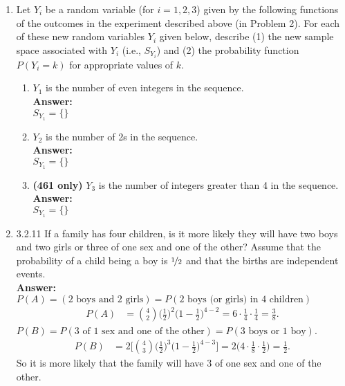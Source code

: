 \documentclass{article}
\begin{document}
\begin{enumerate}
        \item Let $Y_i$ be a random variable (for $i = 1,2,3$) given by the following functions of the outcomes in the experiment described above (in Problem 2). For each of these new random variables $Y_i$ given below, describe (1) the new sample space associated with $Y_i$ (i.e., $S_{Y_i}$) and (2) the probability function $P(Y_i = k)$ for appropriate values of $k$.
            \begin{enumerate}
                \item $Y_1$ is the number of even integers in the sequence.\\
                \textbf{Answer: }\\
                $S_{Y_1} = \{\}$
                
                \item $Y_2$ is the number of 2s in the sequence.\\
                \textbf{Answer: }\\
                $S_{Y_1} = \{\}$
                
                \item \textbf{(461 only)} $Y_3$ is the number of integers greater than 4 in the sequence.\\
                \textbf{Answer: }\\
                $S_{Y_1} = \{\}$
            \end{enumerate}
            
        \item 3.2.11 If a family has four children, is it more likely they will have two boys and two girls or three of one sex and one of the other? Assume that the probability of a child being a boy is $\nicefrac{1}{2}$ and that the births are independent events.\\
        \textbf{Answer: }$P(A) = (\text{2 boys and 2 girls}) = P(\text{2 boys (or girls) in 4 children})$
            \begin{align*}
                P(A) &= {4 \choose 2} \bigg(\frac{1}{2}\bigg)^2\bigg(1-\frac{1}{2}\bigg)^{4-2} = 6 \cdot \frac{1}{4} \cdot \frac{1}{4} = \frac{3}{8}.
            \end{align*}
        $P(B) = P(\text{3 of 1 sex and one of the other}) = P(\text{3 boys or 1 boy})$.
            \begin{align*}
                P(B) &= 2\bigg[{4 \choose 3} \bigg(\frac{1}{2}\bigg)^3\bigg(1-\frac{1}{2}\bigg)^{4-3}\bigg] = 2\bigg(4 \cdot \frac{1}{8} \cdot \frac{1}{2}\bigg) = \frac{1}{2}.
            \end{align*}
        So it is more likely that the family will have 3 of one sex and one of the other.\\
    

\end{enumerate}
\end{document}
